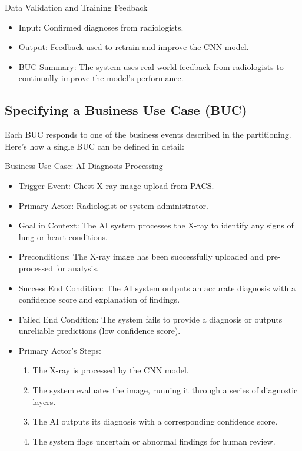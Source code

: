 \documentclass[12pt]{article}
\begin{document}
Data Validation and Training Feedback
\begin{itemize}
    \item Input: Confirmed diagnoses from radiologists.
    \item Output: Feedback used to retrain and improve the CNN model.
    \item BUC Summary: The system uses real-world feedback from radiologists to continually 
        improve the model’s performance.
\end{itemize}

\subsection{Specifying a Business Use Case (BUC)}
Each BUC responds to one of the business events described in the partitioning. Here’s how a single 
BUC can be defined in detail:

Business Use Case: AI Diagnosis Processing
\begin{itemize}
    \item Trigger Event: Chest X-ray image upload from PACS.
    \item Primary Actor: Radiologist or system administrator.
    \item Goal in Context: The AI system processes the X-ray to identify any signs of lung or 
    heart conditions.
    \item Preconditions: The X-ray image has been successfully uploaded and pre-processed for 
    analysis.
    \item Success End Condition: The AI system outputs an accurate diagnosis with a confidence 
    score and explanation of findings.
    \item Failed End Condition: The system fails to provide a diagnosis or outputs unreliable 
    predictions (low confidence score).
    \item {
        Primary Actor's Steps:
        \begin{enumerate}
            \item The X-ray is processed by the CNN model.
            \item The system evaluates the image, running it through a series of diagnostic layers.
            \item The AI outputs its diagnosis with a corresponding confidence score.
            \item The system flags uncertain or abnormal findings for human review.
        \end{enumerate}
    }
\end{itemize}
\end{document}
